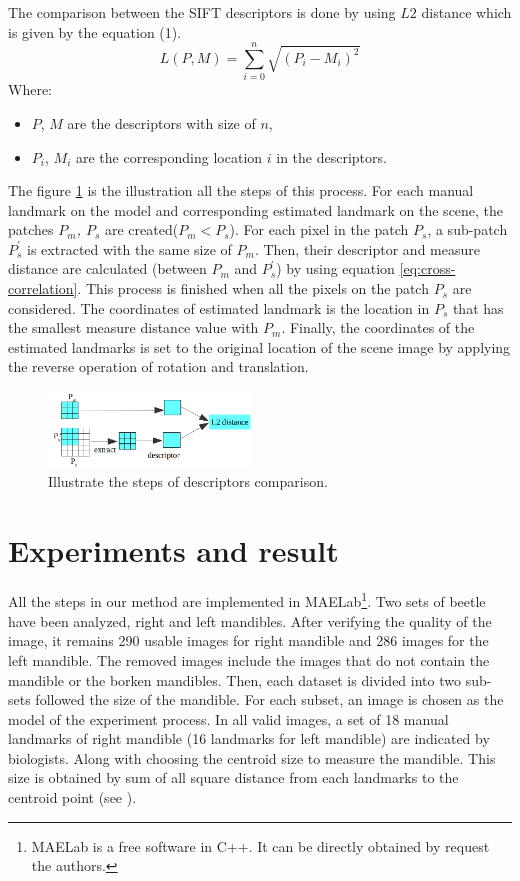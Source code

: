 \documentclass[twoside,twocolumn,10pt]{article}
\begin{document}
The comparison between the SIFT descriptors is done by using $L2$ distance which is given by the equation (1).
\begin{equation}
\label{eq:cross-correlation}
	L(P,M) = \sum\limits_{i = 0}^{n}\sqrt{(P_i-M_i)^2}
\end{equation}
Where:
\begin{itemize}
	\item $P$, $M$ are the descriptors with size of $n$,
	\item  $P_i$, $M_i $ are the corresponding location $i$ in the descriptors.
\end{itemize}
The figure \ref{fig:Illustrate} is the illustration all the steps of this process. For each manual landmark on the model and corresponding estimated landmark on the scene, the patches \textit{$P_m$, $P_s$} are created($P_m < P_s$). For each pixel in the patch \textit{$P_s$}, a sub-patch \textit{$P^{'}_s$} is extracted with the same size of \textit{$P_m$}. Then, their descriptor and measure distance are calculated (between \textit{$P_m$} and \textit{$P^{'}_s$}) by using equation \ref{eq:cross-correlation}. This process is finished when all the pixels on the patch \textit{$P_s$} are considered. The coordinates of estimated landmark is the location in \textit{$P_s$} that has the smallest measure distance value with \textit{$P_m$}. Finally, the coordinates of the estimated landmarks is set to the original location of the scene image by applying the reverse operation of rotation and translation.
\begin{figure}[htb]
    \centering
    \includegraphics[width=0.48\textwidth]{./images/illustration_SIFT}
    \caption{Illustrate the steps of descriptors comparison.}
    \label{fig:Illustrate}
\end{figure}
\section{Experiments and result}
All the steps in our method are implemented in MAELab\footnote{MAELab
  is a free software in C++. It can be directly obtained by request
  the authors.}. Two sets of beetle have been analyzed, right and left
mandibles. After verifying the quality of the image, it remains 290
usable images for right mandible and 286 images for the left mandible. The
removed images include the images that do not contain the mandible or
the borken mandibles. Then, each dataset is divided into two sub-sets followed the size of the mandible. For each subset, an image is chosen as the model of the experiment process. In all valid images, a set of 18 manual landmarks of right mandible (16 landmarks for left mandible) are indicated by biologists. Along with choosing the centroid size to measure the mandible. This size is obtained by sum of all square distance from each landmarks to the
centroid point (see \cite{web2010}).\\
\end{document}

